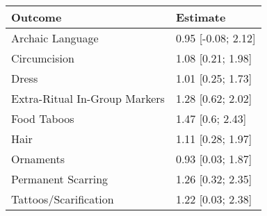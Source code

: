 \begin{tabular}{ll}
\toprule
Outcome & Estimate \\
\midrule
Archaic Language & 0.95 [-0.08; 2.12] \\
Circumcision & 1.08 [0.21; 1.98] \\
Dress & 1.01 [0.25; 1.73] \\
Extra-Ritual In-Group Markers & 1.28 [0.62; 2.02] \\
Food Taboos & 1.47 [0.6; 2.43] \\
Hair & 1.11 [0.28; 1.97] \\
Ornaments & 0.93 [0.03; 1.87] \\
Permanent Scarring & 1.26 [0.32; 2.35] \\
Tattoos/Scarification & 1.22 [0.03; 2.38] \\
\bottomrule
\end{tabular}
